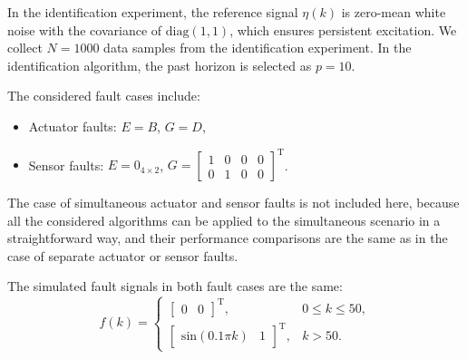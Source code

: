 \documentclass[twocolumn]{autart}
\begin{document}
In the identification experiment, the reference signal $\eta(k)$ is zero-mean white noise with the covariance of $\mathrm{diag}\left( 1,1 \right)$, which ensures persistent excitation.
We collect $N=1000$ data samples from the identification experiment. In the identification algorithm, the past horizon is selected as $p=10$.

The considered fault cases include:
\begin{itemize}
  \item Actuator faults: $E=B$, $G=D$,
  \item Sensor faults: $E = 0_{4 \times 2}$, $G= \left[ \begin{smallmatrix}
                                              1 & 0 & 0 & 0 \\
                                              0 & 1 & 0 & 0
                                            \end{smallmatrix} \right]^\mathrm{T}$.
\end{itemize}
The case of simultaneous actuator and sensor faults is not included here, because all the considered algorithms can be applied to the simultaneous scenario in a straightforward way, and their performance comparisons are the same as in the case of separate actuator or sensor faults.

The simulated fault signals in both fault cases are the same:
$$ f(k) = \left\{ \begin{array}{ll}
   \left[ \begin{array}{cc}
            0 & 0
           \end{array}
   \right]^\mathrm{T}, & 0 \leq k \leq 50, \\
   \left[ \begin{array}{cc}
            \mathrm{sin}\left( 0.1 \pi k \right) & 1
           \end{array}
   \right]^\mathrm{T}, & k > 50.
   \end{array}
   \right. $$
\end{document}
